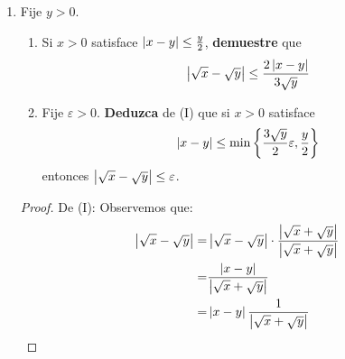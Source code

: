 \documentclass[12pt]{article}
\begin{document}
\begin{enumerate}
\begin{proof}
\begin{equation*}
        \end{equation*}
        De (II): Como $\abs{x-y}\leq\min\left\{\frac{1}{1+2\abs{y}}\varepsilon,1\right\}$, en particular $\abs{x-y}\leq1$. Por tanto se sigue de (I) que:
        \begin{equation*}
            \abs{x^2-y^2}\leq\left(1+2\abs{y}\right)\abs{x-y}
        \end{equation*}
        Pero también $\abs{x-y}\leq\frac{1}{1+2\abs{y}}\varepsilon$. Por tanto:
        \begin{equation*}
            \begin{split}
                \abs{x^2-y^2}=&\left(1+2\abs{y}\right)\abs{x-y}\\
                \leq&\left(1+2\abs{y}\right)\left(\frac{1}{1+2\abs{y}}\varepsilon\right)\\
                =&\varepsilon
            \end{split}
        \end{equation*}
        Luego $\abs{x^2-y^2}\leq\varepsilon$.
        \qed
    \end{proof}
    \item Fije $y>0$.
    \begin{enumerate}
        \item Si $x>0$ satisface $\left| x-y \right|\leq \frac{y}{2}$, \textbf{demuestre} que
        \begin{equation*}
            \left| \sqrt{x}-\sqrt{y} \right|\leq\frac{2\left| x-y \right|}{3\sqrt{y}}
        \end{equation*}
        \item Fije $\varepsilon>0$. \textbf{Deduzca} de (I) que si $x>0$ satisface
        \begin{equation*}
            \left| x-y \right|\leq\min\left\{\frac{3\sqrt{y}}{2}\varepsilon,\frac{y}{2}\right\}
        \end{equation*}
        entonces $\left| \sqrt{x}-\sqrt{y} \right|\leq\varepsilon$.
    \end{enumerate}
    \begin{proof}
        De (I): Observemos que:
        \begin{equation*}
            \begin{split}
                \abs{\sqrt{x}-\sqrt{y}}=&\abs{\sqrt{x}-\sqrt{y}}\cdot\frac{\abs{\sqrt{x}+\sqrt{y}}}{\abs{\sqrt{x}+\sqrt{y}}}\\
                =&\frac{\abs{x-y}}{\abs{\sqrt{x}+\sqrt{y}}}\\
                =&\abs{x-y}\frac{1}{\abs{\sqrt{x}+\sqrt{y}}}
            \end{split}

\end{equation*}
\end{proof}
\end{enumerate}
\end{document}
